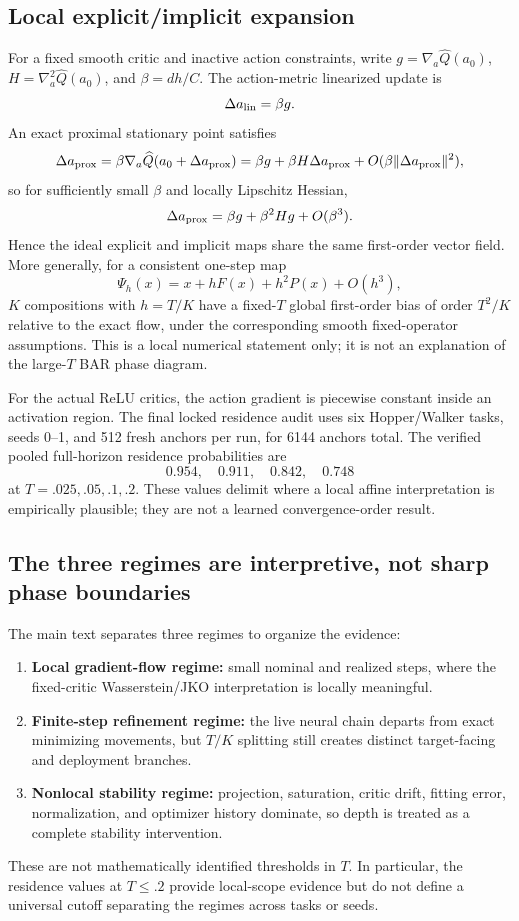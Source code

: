\documentclass[twoside]{article}
\begin{document}
\subsection{Local explicit/implicit expansion}
For a fixed smooth critic and inactive action constraints, write $g=\nabla_a\widehat Q(a_0)$, $H=\nabla_a^2\widehat Q(a_0)$, and $\beta=dh/C$. The action-metric linearized update is
\[
\Delta a_{\rm lin}=\beta g.
\]
An exact proximal stationary point satisfies
\[
\Delta a_{\rm prox}=\beta\nabla_a\widehat Q(a_0+\Delta a_{\rm prox})
=\beta g+\beta H\Delta a_{\rm prox}+O(\beta\|\Delta a_{\rm prox}\|^2),
\]
so for sufficiently small $\beta$ and locally Lipschitz Hessian,
\[
\Delta a_{\rm prox}=\beta g+\beta^2Hg+O(\beta^3).
\]
Hence the ideal explicit and implicit maps share the same first-order vector field. More generally, for a consistent one-step map
\[
\Psi_h(x)=x+hF(x)+h^2P(x)+O(h^3),
\]
$K$ compositions with $h=T/K$ have a fixed-$T$ global first-order bias of order $T^2/K$ relative to the exact flow, under the corresponding smooth fixed-operator assumptions. This is a local numerical statement only; it is not an explanation of the large-$T$ BAR phase diagram.

For the actual ReLU critics, the action gradient is piecewise constant inside an activation region. The final locked residence audit uses six Hopper/Walker tasks, seeds 0--1, and 512 fresh anchors per run, for 6144 anchors total. The verified pooled full-horizon residence probabilities are
\[
0.954,\quad0.911,\quad0.842,\quad0.748
\]
at $T=.025,.05,.1,.2$. These values delimit where a local affine interpretation is empirically plausible; they are not a learned convergence-order result.

\subsection{The three regimes are interpretive, not sharp phase boundaries}
The main text separates three regimes to organize the evidence:
\begin{enumerate}
\item \textbf{Local gradient-flow regime:} small nominal and realized steps, where the fixed-critic Wasserstein/JKO interpretation is locally meaningful.
\item \textbf{Finite-step refinement regime:} the live neural chain departs from exact minimizing movements, but $T/K$ splitting still creates distinct target-facing and deployment branches.
\item \textbf{Nonlocal stability regime:} projection, saturation, critic drift, fitting error, normalization, and optimizer history dominate, so depth is treated as a complete stability intervention.
\end{enumerate}
These are not mathematically identified thresholds in $T$. In particular, the residence values at $T\le.2$ provide local-scope evidence but do not define a universal cutoff separating the regimes across tasks or seeds.
\end{document}
